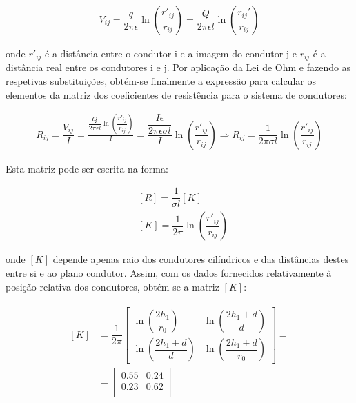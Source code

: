 \documentclass[11pt, a4paper, titlepage, portuguese]{article}
\begin{document}
	\begin{align*}
		V_{ij} = \dfrac{q}{2\pi\epsilon} \ln\left(\dfrac{r'_{ij} }{r_{ij} }\right) = \dfrac{Q}{2\pi\epsilon l} \ln\left(\dfrac{r_{ij} '}{r_{ij} }\right)
	\end{align*}

	\par
	onde $r'_{ij}$ é a distância entre o condutor i e a imagem do condutor j e $r_{ij}$ é a distância real entre os condutores i e j. Por aplicação da Lei de Ohm e fazendo as respetivas substituições, obtém-se finalmente a expressão para calcular os elementos da matriz dos coeficientes de resistência para o sistema de condutores:

	\begin{align*}
		R_{ij} = \dfrac{V_{ij} }{I} = \frac{\dfrac{Q}{2\pi\epsilon l} \ln\left(\dfrac{r'_{ij} }{r_{ij} }\right)}{I}
		= \dfrac{\dfrac{I \epsilon}{2\pi\epsilon \sigma l}}{I} \ln\left(\dfrac{r'_{ij} }{r_{ij} }\right)
		\Rightarrow R_{ij} = \dfrac{1}{2\pi\sigma l}\ln\left(\dfrac{r'_{ij} }{r_{ij} }\right)
	\end{align*}

	\par
	Esta matriz pode ser escrita na forma:

	\begin{align*}
		&[R] = \dfrac{1}{\sigma l} [K]  \\
		&[K] = \dfrac{1}{2 \pi} \ln\left(\dfrac{r'_{ij} }{r_{ij} }\right)
	\end{align*}

	\par
	onde $[K]$ depende apenas raio dos condutores cilíndricos e das distâncias destes entre si e ao plano condutor. Assim, com os dados fornecidos relativamente à posição relativa dos condutores, obtém-se a matriz $[K]$:

	\begin{align*}
		\begin{split}
		[K] &= \dfrac{1}{2\pi}
		\begin{bmatrix}
			\ln\left(\dfrac{2h_1}{r_0}\right) & \ln\left(\dfrac{2h_1 + d}{d}\right)  \\[1em]
			\ln\left(\dfrac{2h_1 + d}{d}\right) & \ln\left(\dfrac{2h_1 + d}{r_0}\right)
		\end{bmatrix} = \\
		&= \begin{bmatrix}
			0.55 & 0.24 \\
			0.23 & 0.62 \\
		\end{bmatrix}
		\end{split}
		\end{align*}
\end{document}
